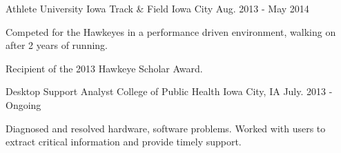 \begin{cventries}
  \cventry
    {Athlete}
    {University Iowa Track \& Field}
    {Iowa City}
    {Aug. 2013 - May 2014}
    {
      \begin{cvitems}
        \item {Competed for the Hawkeyes in a performance driven environment, walking on after 2 years of running.}
        \item {Recipient of the 2013 Hawkeye Scholar Award.}
      \end{cvitems}
    }
  \cventry
    {Desktop Support Analyst}
    {College of Public Health}
    {Iowa City, IA}
    {July. 2013 - Ongoing}
    {
      \begin{cvitems}
        \item {Diagnosed and resolved hardware, software problems. Worked with users to extract critical information and provide timely support. }
      \end{cvitems}
    }
\end{cventries}
